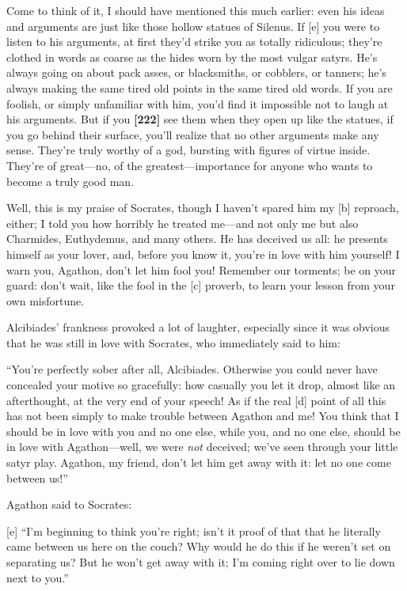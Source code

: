 Come to think of it, I should have mentioned this much earlier: even his
ideas and arguments are just like those hollow statues of Silenus. If
{[}e{]} you were to listen to his arguments, at first they'd strike you
as totally ridiculous; they're clothed in words as coarse as the hides
worn by the most vulgar satyrs. He's always going on about pack asses,
or blacksmiths, or cobblers, or tanners; he's always making the same
tired old points in the same tired old words. If you are foolish, or
simply unfamiliar with him, you'd find it impossible not to laugh at his
arguments. But if you {\bf {[}222{]}} see them when they open up like
the statues, if you go behind their surface, you'll realize that no
other arguments make any sense. They're truly worthy of a god, bursting
with figures of virtue inside. They're of great---no, of the
greatest---importance for anyone who wants to become a truly good man.

Well, this is my praise of Socrates, though I haven't spared him my
{[}b{]} reproach, either; I told you how horribly he treated me---and
not only me but also Charmides, Euthydemus, and many others. He has
deceived us all: he presents himself as your lover, and, before you know
it, you're in love with him yourself! I warn you, Agathon, don't let him
fool you! Remember our torments; be on your guard: don't wait, like the
fool in the {[}c{]} proverb, to learn your lesson from your own
misfortune.\crlf
\crlf

Alcibiades' frankness provoked a lot of laughter, especially since it
was obvious that he was still in love with Socrates, who immediately
said to him:

“You're perfectly sober after all, Alcibiades. Otherwise you could never
have concealed your motive so gracefully: how casually you let it drop,
almost like an afterthought, at the very end of your speech! As if the
real {[}d{]} point of all this has not been simply to make trouble
between Agathon and me! You think that I should be in love with you and
no one else, while you, and no one else, should be in love with
Agathon---well, we were {\em not} deceived; we've seen through your
little satyr play. Agathon, my friend, don't let him get away with it:
let no one come between us!”

Agathon said to Socrates:

{[}e{]} “I'm beginning to think you're right; isn't it proof of that
that he literally came between us here on the couch? Why would he do
this if he weren't set on separating us? But he won't get away with it;
I'm coming right over to lie down next to you.”

